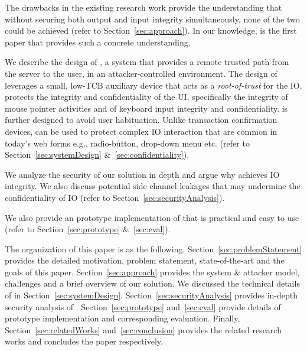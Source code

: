 \begin{mybullet}
  \item The drawbacks in the existing research work provide the understanding that without securing both output and input integrity simultaneously, none of the two could be achieved (refer to Section~\ref{sec:approach}). In our knowledge, \name is the first paper that provides such a concrete understanding.
  \item We describe the design of \name, a system that provides a remote trusted path from the server to the user, in an attacker-controlled environment. The design of \name leverages a small, low-TCB auxiliary device that acts as a \emph{root-of-trust} for the IO. \name protects the integrity and confidentiality of the UI, specifically the integrity of mouse pointer activities and of keyboard input integrity and confidentiality. \name is further designed to avoid user habituation. Unlike transaction confirmation devices, \name can be used to protect complex IO interaction that are common in today's web forms e.g., radio-button, drop-down menu etc. (refer to Section~\ref{sec:systemDesign} \&~\ref{sec:confidentiality}).
  \item We analyze the security of our solution in depth and argue why \name achieves IO integrity. We also discuss potential side channel leakages that may undermine the confidentiality of IO (refer to Section~\ref{sec:securityAnalysis}). 
  \item We also provide an prototype implementation of \name that is practical and easy to use (refer to Section~\ref{sec:prototype} \&~\ref{sec:eval}).
\end{mybullet}


 The organization of this paper is as the following. Section~\ref{sec:problemStatement} provides the detailed motivation, problem statement, state-of-the-art and the goals of this paper. Section~\ref{sec:approach} provides the system \& attacker model, challenges and a brief overview of our solution. We discussed the technical details of \name in Section~\ref{sec:systemDesign}. Section~\ref{sec:securityAnalysis} provides in-depth security analysis of \name. Section~\ref{sec:prototype} and~\ref{sec:eval} provide details of \name prototype implementation and corresponding evaluation. Finally, Section~\ref{sec:relatedWorks} and~\ref{sec:conclusion} provides the related research works and concludes the paper respectively.


